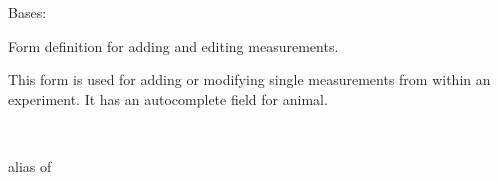 \documentclass[letterpaper,10pt,english]{sphinxmanual}
\begin{document}
\begin{fulllineitems}
\label{api:mousedb.data.forms.MeasurementForm}
Bases: 

Form definition for adding and editing measurements.

This form is used for adding or modifying single measurements from within an experiment.  It has an autocomplete field for animal.


\begin{fulllineitems}
\label{api:mousedb.data.forms.MeasurementForm.Media}
\end{fulllineitems}



\begin{fulllineitems}
\label{api:mousedb.data.forms.MeasurementForm.Meta}~

\begin{fulllineitems}
\label{api:mousedb.data.forms.MeasurementForm.Meta.model}
alias of 

\end{fulllineitems}


\end{fulllineitems}



\begin{fulllineitems}
\label{api:mousedb.data.forms.MeasurementForm.media}
\end{fulllineitems}


\end{fulllineitems}


\end{document}
